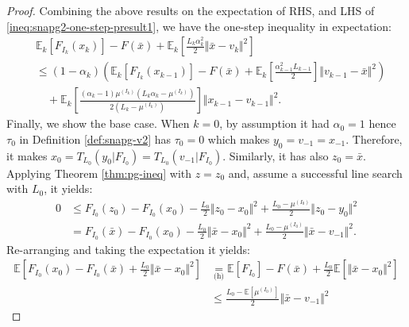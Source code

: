 \documentclass[12pt]{article}
\begin{document}
\begin{proof}
        \par
        Combining the above results on the expectation of RHS, and LHS of \eqref{ineq:snapg2-one-step-presult1}, we have the one-step inequality in expectation: 
        \begin{align*}
            & \mathbb E_k\left[F_{I_k}(x_{k})\right] 
            - F(\bar x) 
            + \mathbb E_k\left[
                \frac{L_k\alpha_k^2}{2}\Vert \bar x - v_k\Vert^2 
            \right]
            \\
            &\le 
            (1 - \alpha_k)\left(
                    \mathbb E_k \left[F_{I_k}(x_{k - 1})\right] 
                    - F(\bar x)
                    + \mathbb E_k \left[\frac{\alpha_{k - 1}^2L_{k - 1}}{2}\right]\Vert v_{k - 1} - \bar x\Vert^2
            \right)
                \\ &\quad 
                + \mathbb E_k\left[
                    \frac{(\alpha_k - 1)\mu^{(I_k)}\left(L_k\alpha_k - \mu^{(I_k)}\right)}{2\left(L_k - \mu^{(I_k)}\right)}
                \right]\Vert x_{k - 1} - v_{k - 1} \Vert^2. 
        \end{align*}
        Finally, we show the base case. 
        When $k = 0$, by assumption it had $\alpha_0 = 1$ hence $\tau_0$ in Definition \ref{def:snapg-v2} has $\tau_0 = 0$ which makes $y_0 = v_{- 1} = x_{-1}$. 
        Therefore, it makes $x_0 = T_{L_0}(y_0 | F_{I_0}) = T_{L_0}(v_{-1} | F_{I_0})$. 
        Similarly, it has also $z_0 = \bar x$.
        Applying Theorem \ref{thm:pg-ineq} with $z = z_0$ and, assume a successful line search with $L_0$, it yields: 
        \begin{align*}
            0 &\le F_{I_0}(z_0) - F_{I_0}(x_0) - \frac{L_0}{2}\Vert z_0 - x_0\Vert^2 + \frac{L_0 - \mu^{(I_0)}}{2}\Vert z_0 - y_0\Vert^2
            \\
            &= F_{I_0}(\bar x) - F_{I_0}(x_0) - \frac{L_0}{2}\Vert \bar x - x_0\Vert^2 + \frac{L_0 - \mu^{(I_0)}}{2}\Vert \bar x - v_{-1}\Vert^2. 
        \end{align*}
        Re-arranging and taking the expectation it yields: 
        \begin{align*}
            \mathbb E \left[
                F_{I_0}(x_0) - F_{I_0}(\bar x) + \frac{L_0}{2}\Vert \bar x - x_0\Vert^2
            \right]
            &\underset{\text{(h)}}{=}
            \mathbb E \left[ F_{I_0}\right] - F(\bar x) 
            + \frac{L_0}{2}\mathbb E \left[\Vert \bar x - x_0\Vert^2\right]
            \\
            &\le \frac{L_0 - \mathbb E \left[\mu^{(I_0)}\right]}{2}\Vert \bar x - v_{-1}\Vert^2

\end{align*}
\end{proof}
\end{document}

